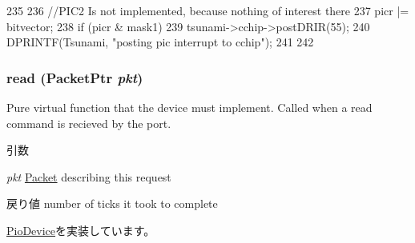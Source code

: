 \begin{DoxyCode}
235 {
236     //PIC2 Is not implemented, because nothing of interest there
237     picr |= bitvector;
238     if (picr & mask1) {
239         tsunami->cchip->postDRIR(55);
240         DPRINTF(Tsunami, "posting pic interrupt to cchip\n");
241     }
242 }
\end{DoxyCode}
\hypertarget{classTsunamiIO_a613ec7d5e1ec64f8d21fec78ae8e568e}{
\subsubsection[{read}]{ read ({\bf PacketPtr} {\em pkt})}}
\label{classTsunamiIO_a613ec7d5e1ec64f8d21fec78ae8e568e}
Pure virtual function that the device must implement. Called when a read command is recieved by the port. 
\begin{DoxyParams}{引数}
\item[{\em pkt}]\hyperlink{classPacket}{Packet} describing this request \end{DoxyParams}
\begin{DoxyReturn}{戻り値}
number of ticks it took to complete 
\end{DoxyReturn}


\hyperlink{classPioDevice_a842312590432036092c422c87a442358}{PioDevice}を実装しています。


